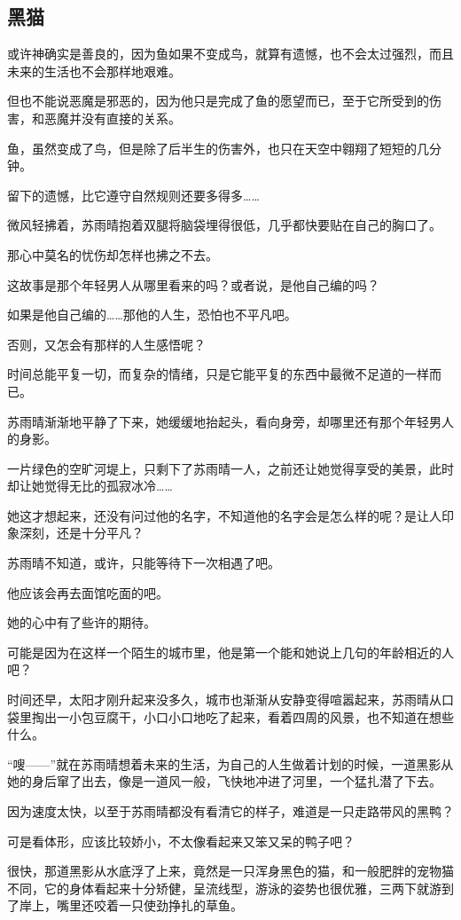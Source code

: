 \subsection{黑猫}

或许神确实是善良的，因为鱼如果不变成鸟，就算有遗憾，也不会太过强烈，而且未来的生活也不会那样地艰难。

但也不能说恶魔是邪恶的，因为他只是完成了鱼的愿望而已，至于它所受到的伤害，和恶魔并没有直接的关系。

鱼，虽然变成了鸟，但是除了后半生的伤害外，也只在天空中翱翔了短短的几分钟。

留下的遗憾，比它遵守自然规则还要多得多……

微风轻拂着，苏雨晴抱着双腿将脑袋埋得很低，几乎都快要贴在自己的胸口了。

那心中莫名的忧伤却怎样也拂之不去。

这故事是那个年轻男人从哪里看来的吗？或者说，是他自己编的吗？

如果是他自己编的……那他的人生，恐怕也不平凡吧。

否则，又怎会有那样的人生感悟呢？

时间总能平复一切，而复杂的情绪，只是它能平复的东西中最微不足道的一样而已。

苏雨晴渐渐地平静了下来，她缓缓地抬起头，看向身旁，却哪里还有那个年轻男人的身影。

一片绿色的空旷河堤上，只剩下了苏雨晴一人，之前还让她觉得享受的美景，此时却让她觉得无比的孤寂冰冷……

她这才想起来，还没有问过他的名字，不知道他的名字会是怎么样的呢？是让人印象深刻，还是十分平凡？

苏雨晴不知道，或许，只能等待下一次相遇了吧。

他应该会再去面馆吃面的吧。

她的心中有了些许的期待。

可能是因为在这样一个陌生的城市里，他是第一个能和她说上几句的年龄相近的人吧？

时间还早，太阳才刚升起来没多久，城市也渐渐从安静变得喧嚣起来，苏雨晴从口袋里掏出一小包豆腐干，小口小口地吃了起来，看着四周的风景，也不知道在想些什么。

“嗖——”就在苏雨晴想着未来的生活，为自己的人生做着计划的时候，一道黑影从她的身后窜了出去，像是一道风一般，飞快地冲进了河里，一个猛扎潜了下去。

因为速度太快，以至于苏雨晴都没有看清它的样子，难道是一只走路带风的黑鸭？

可是看体形，应该比较娇小，不太像看起来又笨又呆的鸭子吧？

很快，那道黑影从水底浮了上来，竟然是一只浑身黑色的猫，和一般肥胖的宠物猫不同，它的身体看起来十分矫健，呈流线型，游泳的姿势也很优雅，三两下就游到了岸上，嘴里还咬着一只使劲挣扎的草鱼。

